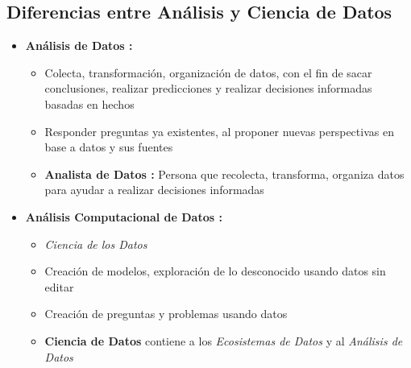 \subsection{Diferencias entre Análisis y Ciencia de Datos}
\begin{itemize}
    \item {\textbf{Análisis de Datos : }
    \begin{itemize}
        \item {Colecta, transformación, organización de datos, con el fin de sacar conclusiones, realizar predicciones y realizar decisiones informadas basadas en hechos}
        \item {Responder preguntas ya existentes, al proponer nuevas perspectivas en base a datos y sus fuentes}
        \item {\textbf{Analista de Datos : }Persona que recolecta, transforma, organiza datos para ayudar a realizar decisiones informadas}
    \end{itemize}}
    \item {\textbf{Análisis Computacional de Datos : }
    \begin{itemize}
        \item {\textit{Ciencia de los Datos }}
        \item {Creación de modelos, exploración de lo desconocido usando datos sin editar}
        \item {Creación de preguntas y problemas usando datos}
        \item {\textbf{Ciencia de Datos} contiene a los \textit{Ecosistemas de Datos} y al \textit{Análisis de Datos}}
    \end{itemize}}
\end{itemize}

\newpage